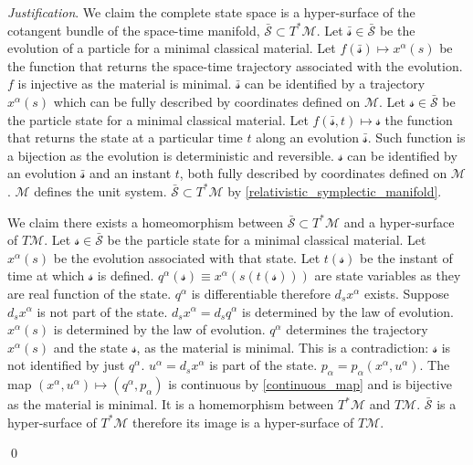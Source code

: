 \documentclass[aps,pra,10pt,twocolumn,floatfix,nofootinbib]{revtex4-1}
\numberwithin{equation}{section}
\theoremstyle{definition}
\newenvironment{justification}{\emph{Justification}.}{\qed}
\begin{document}
\begin{justification}
	We claim the complete state space is a hyper-surface of the cotangent bundle of the space-time manifold, $\bar{\mathcal{S}} \subset T^*\mathcal{M}$. Let $\bar{\mathcal{s}} \in \bar{\mathcal{S}}$ be the evolution of a particle for a minimal classical material. Let $f(\bar{\mathcal{s}}) \mapsto x^\alpha(s)$ be the function that returns the space-time trajectory associated with the evolution. $f$ is injective as the material is minimal. $\bar{\mathcal{s}}$ can be identified by a trajectory $x^\alpha(s)$ which can be fully described by coordinates defined on $\mathcal{M}$. Let $\mathcal{s} \in \bar{\mathcal{S}}$ be the particle state for a minimal classical material. Let $f(\bar{\mathcal{s}}, t) \mapsto \mathcal{s}$ the function that returns the state at a particular time $t$ along an evolution $\bar{\mathcal{s}}$. Such function is a bijection as the evolution is deterministic and reversible. $\mathcal{s}$ can be identified by an evolution $\bar{\mathcal{s}}$ and an instant $t$, both fully described by coordinates defined on $\mathcal{M}$. $\mathcal{M}$ defines the unit system. $\bar{\mathcal{S}} \subset T^*\mathcal{M}$ by \ref{relativistic_symplectic_manifold}.
	
	We claim there exists a homeomorphism between $\bar{\mathcal{S}} \subset T^*\mathcal{M}$ and a hyper-surface of $T\mathcal{M}$. Let $\mathcal{s} \in \bar{\mathcal{S}}$ be the particle state for a minimal classical material. Let $x^\alpha(s)$ be the evolution associated with that state. Let $t(\mathcal{s})$ be the instant of time at which $\mathcal{s}$ is defined. $q^\alpha(\mathcal{s}) \equiv x^\alpha(s(t(\mathcal{s})))$ are state variables as they are real function of the state. $q^\alpha$ is differentiable therefore $d_s x^\alpha$ exists. Suppose $d_s x^\alpha$ is not part of the state. $d_s x^\alpha = d_s q^\alpha$ is determined by the law of evolution. $x^\alpha(s)$ is determined by the law of evolution. $q^\alpha$ determines the trajectory $x^\alpha(s)$ and the state $\mathcal{s}$, as the material is minimal. This is a contradiction: $\mathcal{s}$ is not identified by just $q^\alpha$. $u^\alpha=d_s x^\alpha$ is part of the state. $p_\alpha = p_\alpha(x^\alpha, u^\alpha)$. The map $(x^\alpha, u^\alpha) \mapsto (q^\alpha, p_\alpha)$ is continuous by \ref{continuous_map} and is bijective as the material is minimal. It is a homemorphism between $T^*\mathcal{M}$ and $T\mathcal{M}$. $\bar{\mathcal{S}}$ is a hyper-surface of $T^*\mathcal{M}$ therefore its image is a hyper-surface of $T\mathcal{M}$.
	

\end{justification}
\end{document}
